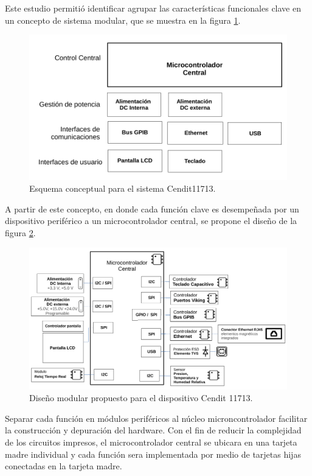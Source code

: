 \documentclass[paper=letter,oneside,fontsize=12pt, parskip=full]{article}
\begin{document}
	Este estudio permitió identificar agrupar las características funcionales clave en un concepto de sistema modular, que se muestra en la figura \ref{Fig:EsquemaConceptualCendit11713}.
	
	\begin{figure}[h!]
		\includegraphics[width=18cm]{Imagenes/EsquemaConceptualCendit11713.pdf}
		\caption{Esquema conceptual para el sistema Cendit11713.}
		\label{Fig:EsquemaConceptualCendit11713}
	\end{figure}

	A partir de este concepto, en donde cada función clave es desempeñada por un dispositivo periférico a un microcontrolador central, se propone el diseño de la figura \ref{Fig:EsquemaCendit11713Detallado}.

	\begin{figure}[h!]
		\includegraphics[width=18cm]{Imagenes/EsquemaCendit11713Detallado.pdf}
		\caption{Diseño modular propuesto para el dispositivo Cendit 11713.}
		\label{Fig:EsquemaCendit11713Detallado}
	\end{figure}	

	Separar cada función en módulos periféricos al núcleo microncontrolador facilitar la construcción y depuración del hardware. Con el fin de reducir la complejidad de los circuitos impresos, el microcontrolador central se ubicara en una tarjeta madre individual y cada función sera implementada por medio de tarjetas hijas conectadas en la tarjeta madre.
\end{document}
